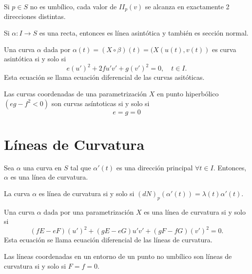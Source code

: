 \begin{obs}
  Si $p \in S$ no es umbílico, cada valor de $II_{p}(v)$ se alcanza en exactamente 2 direcciones distintas.
\end{obs}

\begin{obs}
  Si $\alpha : I \to S$ es una recta, entonces es línea asintótica y también es sección normal. 
\end{obs}

\begin{prop}
  Una curva $\alpha$ dada por $\alpha(t) = (X \circ \beta)(t) = (X(u(t),v(t))$ es curva asintótica si y solo si
  \[ 
    e(u')^{2} + 2 f u' v' + g (v')^{2} = 0, \quad t \in I .
  \] 
  Esta ecuación se llama ecuación diferencial de las curvas asitóticas.
\end{prop}

\begin{lem}
  Las curvas coordenadas de una parametrización $X$ en punto hiperbólico $(eg - f^{2} < 0)$ son curvas asíntoticas si y solo si
  \[ 
    e=g=0 
  \] 
\end{lem}

\section{Líneas de Curvatura}

\begin{defn}
  Sea $\alpha$ una curva en $S$ tal que $\alpha'(t)$ es una dirección principal $\forall t \in I$. Entonces, $\alpha$ es una línea de curvatura.
\end{defn}

\begin{obs}
  La curva $\alpha$ es línea de curvatura si y solo si $(d N)_{p}(\alpha'(t)) = \lambda(t) \alpha'(t)$.
\end{obs}

\begin{prop}
  Una curva $\alpha$ dada por una parametrización $X$ es una línea de curvatura si y solo si
  \[ 
    (fE - eF)(u')^{2} + (gE - eG)u'v' + (gF - fG)(v')^{2} = 0 .
  \] 
  Esta ecuación se llama ecuación diferencial de las líneas de curvatura.
\end{prop}

\begin{lem}
  Las líneas coordenadas en un entorno de un punto no umbílico son líneas de curvatura si y solo si $F = f = 0$.
\end{lem}

